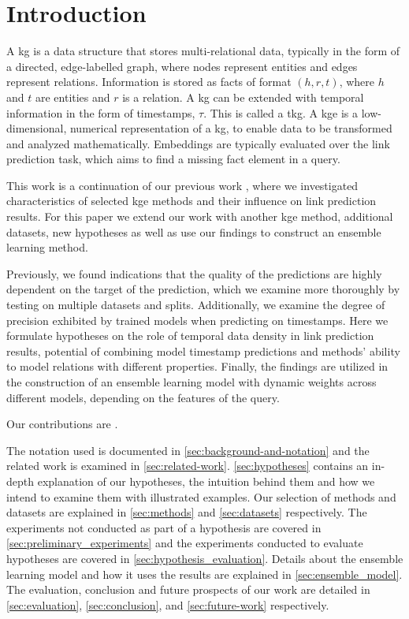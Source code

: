\section{Introduction}
\label{sec:introduction}

A \gls{kg} is a data structure that stores multi-relational data, typically in the form of a directed, edge-labelled graph, where nodes represent entities and edges represent relations.
Information is stored as facts of format $(h,r,t)$, where $h$ and $t$ are entities and $r$ is a relation.
A \gls{kg} can be extended with temporal information in the form of timestamps, $\tau$. This is called a \gls{tkg}.
A \gls{kge} is a low-dimensional, numerical representation of a \gls{kg}, to enable data to be transformed and analyzed mathematically.
Embeddings are typically evaluated over the link prediction task, which aims to find a missing fact element in a query.

This work is a continuation of our previous work \cite{P9}, where we investigated characteristics of selected \gls{kge} methods and their influence on link prediction results. For this paper we extend our work with another \gls{kge} method, additional datasets, new hypotheses as well as use our findings to construct an ensemble learning method.

Previously, we found indications that the quality of the predictions are highly dependent on the target of the prediction, which we examine more thoroughly by testing on multiple datasets and splits. Additionally, we examine the degree of precision exhibited by trained models when predicting on timestamps.
Here we formulate hypotheses on the role of temporal data density in link prediction results, potential of combining model timestamp predictions and methods' ability to model relations with different properties.
Finally, the findings are utilized in the construction of an ensemble learning model with dynamic weights across different models, depending on the features of the query.

Our contributions are .

The notation used is documented in \autoref{sec:background-and-notation} and the related work is examined in \autoref{sec:related-work}.
\autoref{sec:hypotheses} contains an in-depth explanation of our hypotheses, the intuition behind them and how we intend to examine them with illustrated examples.
Our selection of methods and datasets are explained in \autoref{sec:methods} and \autoref{sec:datasets} respectively.
The experiments not conducted as part of a hypothesis are covered in \autoref{sec:preliminary_experiments} and the experiments conducted to evaluate hypotheses are covered in \autoref{sec:hypothesis_evaluation}.
Details about the ensemble learning model and how it uses the results are explained in \autoref{sec:ensemble_model}.
The evaluation, conclusion and future prospects of our work are detailed in \autoref{sec:evaluation}, \autoref{sec:conclusion}, and \autoref{sec:future-work} respectively.


